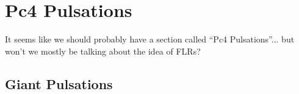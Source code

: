 






\section{Pc4 Pulsations}

It seems like we should probably have a section called ``Pc4 Pulsations''... but won't we mostly be talking about the idea of FLRs?

\subsection{Giant Pulsations}


%
%




